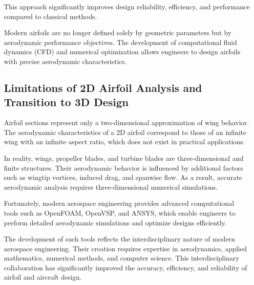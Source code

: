 This approach significantly improves design reliability, efficiency, and performance compared to classical methods.

Modern airfoils are no longer defined solely by geometric parameters but by aerodynamic performance objectives. 
The development of computational fluid dynamics (CFD) and numerical optimization 
allows engineers to design airfoils with precise aerodynamic characteristics.


\subsection*{Limitations of 2D Airfoil Analysis and Transition to 3D Design}

Airfoil sections represent only a two-dimensional approximation of wing behavior. 
The aerodynamic characteristics of a 2D airfoil correspond to those of an infinite wing with an infinite aspect ratio, 
which does not exist in practical applications.

In reality, wings, propeller blades, and turbine blades are three-dimensional and finite structures. 
Their aerodynamic behavior is influenced by additional factors such as wingtip vortices, induced drag, and spanwise flow. 
As a result, accurate aerodynamic analysis requires three-dimensional numerical simulations.

Fortunately, modern aerospace engineering provides advanced computational tools such as OpenFOAM, OpenVSP, and ANSYS, 
which enable engineers to perform detailed aerodynamic simulations and optimize designs efficiently.

The development of such tools reflects the interdisciplinary nature of modern aerospace engineering. 
Their creation requires expertise in aerodynamics, applied mathematics, numerical methods, and computer science. 
This interdisciplinary collaboration has significantly improved the accuracy, efficiency, and reliability of airfoil and aircraft design.
